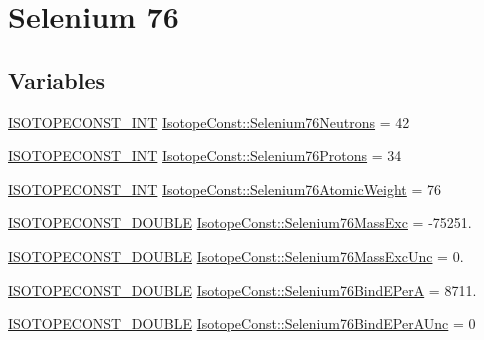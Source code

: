 \hypertarget{group___isotope_const-_selenium-_se76}{}\section{Selenium 76}
\label{group___isotope_const-_selenium-_se76}
\subsection*{Variables}
\begin{DoxyCompactItemize}
\item 
\mbox{\hyperlink{group___isotope_const-_macros_ga5f18360b3e99483a35c32d789e62621c}{I\+S\+O\+T\+O\+P\+E\+C\+O\+N\+S\+T\+\_\+\+I\+NT}} \mbox{\hyperlink{group___isotope_const-_selenium-_se76_ga34249371603f809762e6686efb169bee}{Isotope\+Const\+::\+Selenium76\+Neutrons}} = 42
\item 
\mbox{\hyperlink{group___isotope_const-_macros_ga5f18360b3e99483a35c32d789e62621c}{I\+S\+O\+T\+O\+P\+E\+C\+O\+N\+S\+T\+\_\+\+I\+NT}} \mbox{\hyperlink{group___isotope_const-_selenium-_se76_ga8b3d2e42e68430de233c3d6315e905b3}{Isotope\+Const\+::\+Selenium76\+Protons}} = 34
\item 
\mbox{\hyperlink{group___isotope_const-_macros_ga5f18360b3e99483a35c32d789e62621c}{I\+S\+O\+T\+O\+P\+E\+C\+O\+N\+S\+T\+\_\+\+I\+NT}} \mbox{\hyperlink{group___isotope_const-_selenium-_se76_gab806d631ffcce398a025093fef030dc1}{Isotope\+Const\+::\+Selenium76\+Atomic\+Weight}} = 76
\item 
\mbox{\hyperlink{group___isotope_const-_macros_ga8f45a7272ce02c0b4c65c44636ed719a}{I\+S\+O\+T\+O\+P\+E\+C\+O\+N\+S\+T\+\_\+\+D\+O\+U\+B\+LE}} \mbox{\hyperlink{group___isotope_const-_selenium-_se76_gaebebfb9a5abe590e501985c7eec6c6db}{Isotope\+Const\+::\+Selenium76\+Mass\+Exc}} = -\/75251.
\item 
\mbox{\hyperlink{group___isotope_const-_macros_ga8f45a7272ce02c0b4c65c44636ed719a}{I\+S\+O\+T\+O\+P\+E\+C\+O\+N\+S\+T\+\_\+\+D\+O\+U\+B\+LE}} \mbox{\hyperlink{group___isotope_const-_selenium-_se76_ga1f89ab43e9db13a6f0c22106150ac3b1}{Isotope\+Const\+::\+Selenium76\+Mass\+Exc\+Unc}} = 0.
\item 
\mbox{\hyperlink{group___isotope_const-_macros_ga8f45a7272ce02c0b4c65c44636ed719a}{I\+S\+O\+T\+O\+P\+E\+C\+O\+N\+S\+T\+\_\+\+D\+O\+U\+B\+LE}} \mbox{\hyperlink{group___isotope_const-_selenium-_se76_gae6d9fb11b489426c6ad2534f5ddd7dcd}{Isotope\+Const\+::\+Selenium76\+Bind\+E\+PerA}} = 8711.
\item 
\mbox{\hyperlink{group___isotope_const-_macros_ga8f45a7272ce02c0b4c65c44636ed719a}{I\+S\+O\+T\+O\+P\+E\+C\+O\+N\+S\+T\+\_\+\+D\+O\+U\+B\+LE}} \mbox{\hyperlink{group___isotope_const-_selenium-_se76_gab199a401a89f983f8ccb5091256666dd}{Isotope\+Const\+::\+Selenium76\+Bind\+E\+Per\+A\+Unc}} = 0

\end{DoxyCompactItemize}
